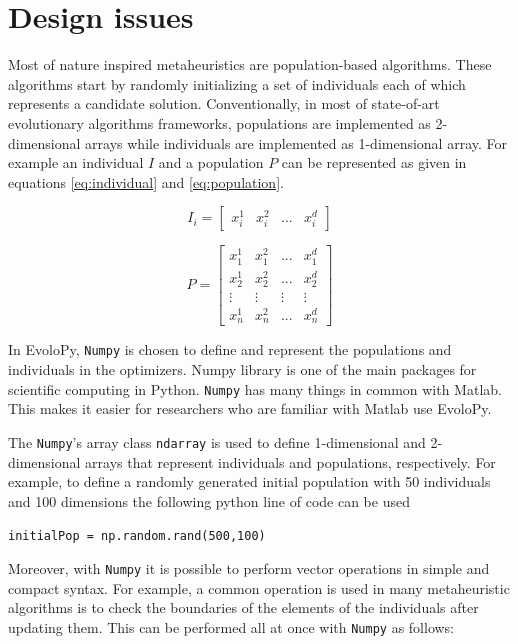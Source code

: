 \documentclass[a4paper,twoside]{article}
\begin{document}
\section{Design issues}

Most of nature inspired metaheuristics are population-based algorithms. These algorithms start by randomly initializing a set of individuals each of which represents a candidate solution. Conventionally, in most of state-of-art evolutionary algorithms frameworks, populations are implemented as 2-dimensional arrays while individuals are implemented as 1-dimensional array. For example an individual $I$ and a population $P$ can be represented as given in equations \ref{eq:individual} and \ref{eq:population}.

\begin{equation}
I_{i}=[\begin{array}{cccc}
x_{i}^{1} & x_{i}^{2} & ... & x_{i}^{d}\end{array}]
\label{eq:individual}
\end{equation}

\begin{equation}
P=\left[\begin{array}{cccc}
x_{1}^{1} & x_{1}^{2} & ... & x_{1}^{d}\\
x_{2}^{1} & x_{2}^{2} & ... & x_{2}^{d}\\
\vdots & \vdots & \vdots & \vdots\\
x_{n}^{1} & x_{n}^{2} & ... & x_{n}^{d}
\end{array}\right]
\label{eq:population}
\end{equation}

In EvoloPy, \texttt{Numpy} is chosen to define and represent the populations and individuals in the optimizers. Numpy library is one of the main packages for scientific computing in Python. \texttt{Numpy} has many things in common with Matlab. This makes it easier for researchers who are familiar with Matlab use EvoloPy. 

The \texttt{Numpy}’s array class  \texttt{ndarray} is used to define 1-dimensional and 2-dimensional arrays that represent individuals and populations, respectively. For example, to define a randomly generated initial population with 50 individuals and 100 dimensions the following python line of code can be used

\texttt{initialPop = np.random.rand(500,100)}


Moreover, with \texttt{Numpy} it is possible to perform vector operations in simple and compact syntax. For example, a common operation is used in many metaheuristic algorithms is to check the boundaries of the elements of the individuals after updating them. This can be performed all at once with \texttt{Numpy} as follows:
\end{document}
